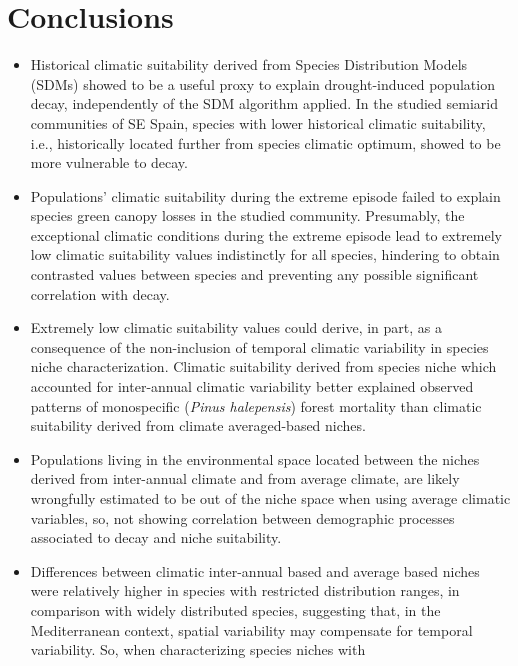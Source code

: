 \documentclass[11pt,twoside]{reedthesis}
\begin{document}
\section{Conclusions}\label{conclusions}
\begin{itemize}
\item
  Historical climatic suitability derived from Species Distribution
  Models (SDMs) showed to be a useful proxy to explain drought-induced
  population decay, independently of the SDM algorithm applied. In the
  studied semiarid communities of SE Spain, species with lower
  historical climatic suitability, i.e., historically located further
  from species climatic optimum, showed to be more vulnerable to
  decay.\par
\item
  Populations' climatic suitability during the extreme episode failed to
  explain species green canopy losses in the studied community.
  Presumably, the exceptional climatic conditions during the extreme
  episode lead to extremely low climatic suitability values indistinctly
  for all species, hindering to obtain contrasted values between species
  and preventing any possible significant correlation with decay.\par
\item
  Extremely low climatic suitability values could derive, in part, as a
  consequence of the non-inclusion of temporal climatic variability in
  species niche characterization. Climatic suitability derived from
  species niche which accounted for inter-annual climatic variability
  better explained observed patterns of monospecific (\emph{Pinus
  halepensis}) forest mortality than climatic suitability derived from
  climate averaged-based niches.\par
\item
  Populations living in the environmental space located between the
  niches derived from inter-annual climate and from average climate, are
  likely wrongfully estimated to be out of the niche space when using
  average climatic variables, so, not showing correlation between
  demographic processes associated to decay and niche suitability.\par
\item
  Differences between climatic inter-annual based and average based
  niches were relatively higher in species with restricted distribution
  ranges, in comparison with widely distributed species, suggesting
  that, in the Mediterranean context, spatial variability may compensate
  for temporal variability. So, when characterizing species niches with

\end{itemize}
\end{document}
